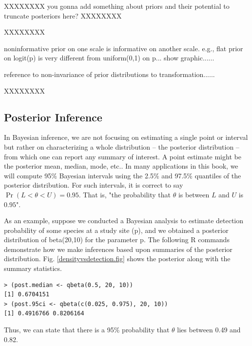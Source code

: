 XXXXXXXX
you gonna add something about priors and their potential to truncate posteriors here?
XXXXXXXX

XXXXXXXX

noninformative prior on one scale is informative on another scale.
e.g., flat prior on logit(p) is very different from uniform(0,1) on
p...
show graphic......

reference to non-invariance of prior distributions to transformation......

XXXXXXXX

\subsection{Posterior Inference}

In Bayesian inference, we are not focusing on estimating a single
point or interval but rather on characterizing a whole distribution --
the posterior distribution -- from which one can report any summary of
interest. A point estimate might be the posterior mean, median, mode,
etc..  In many applications in this book, we will compute 95\%
Bayesian intervals using the 2.5\% and 97.5\% quantiles of the
posterior distribution. For such intervals, it is correct to say
$\Pr(L < \theta < U) = 0.95$. That is, "the probability that $\theta$
is between $L$ and $U$ is $0.95$". 

As an
example, suppose we conducted a Bayesian analysis to estimate
detection probability of some species at a study site (p), and we
obtained a posterior distribution of beta(20,10) for the parameter
p. The following R commands demonstrate how we make inferences based
upon summaries of the posterior distribution. Fig. \ref{densityvsdetection.fig} shows the
posterior along with the summary statistics.

\begin{verbatim}
> (post.median <- qbeta(0.5, 20, 10))
[1] 0.6704151
> (post.95ci <- qbeta(c(0.025, 0.975), 20, 10))
[1] 0.4916766 0.8206164
\end{verbatim}

Thus, we can state that there is a 95\% probability that $\theta$ lies
between 0.49 and 0.82.

